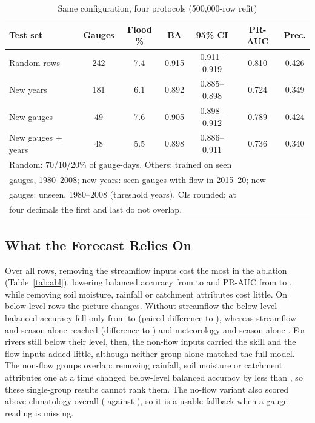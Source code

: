 \documentclass[conference]{IEEEtran}
\begin{document}
\begin{table}[t]
\caption{Same configuration, four protocols (500,000-row refit)}
\label{tab:leak}
\centering
\footnotesize
\setlength{\tabcolsep}{1.6pt}
\begin{tabular}{lcccccc}
\toprule
Test set & Gauges & Flood \% & BA & 95\% CI & PR-AUC & Prec.\\
\midrule
Random rows & 242 & 7.4 & 0.915 & 0.911--0.919 & 0.810 & 0.426\\
New years & 181 & 6.1 & 0.892 & 0.885--0.898 & 0.724 & 0.349\\
New gauges & 49 & 7.6 & 0.905 & 0.898--0.912 & 0.789 & 0.424\\
New gauges + years & 48 & 5.5 & 0.898 & 0.886--0.911 & 0.736 & 0.340\\
\bottomrule
\multicolumn{7}{l}{\scriptsize Random: 70/10/20\% of gauge-days. Others: trained on seen}\\
\multicolumn{7}{l}{\scriptsize gauges, 1980--2008; new years: seen gauges with flow in 2015--20; new}\\
\multicolumn{7}{l}{\scriptsize gauges: unseen, 1980--2008 (threshold years). CIs rounded; at}\\
\multicolumn{7}{l}{\scriptsize four decimals the first and last do not overlap.}\\
\end{tabular}
\end{table}

\subsection{What the Forecast Relies On}
Over all rows, removing the streamflow inputs cost the most in the ablation (Table~\ref{tab:abl}), lowering balanced accuracy from \AblAllBA{} to \NoFlowBA{} and PR-AUC from \AblAllPR{} to \NoFlowPR, while removing soil moisture, rainfall or catchment attributes cost little. On below-level rows the picture changes. Without streamflow the below-level balanced accuracy fell only from \OnsetAll{} to \OnsetNoFlow{} (paired difference \BelNoFlowLo{} to \BelNoFlowHi), whereas streamflow and season alone reached \OnsetFlowOnly{} (difference \BelNoMetLo{} to \BelNoMetHi) and meteorology and season alone \MetOnBA. For rivers still below their level, then, the non-flow inputs carried the skill and the flow inputs added little, although neither group alone matched the full model. The non-flow groups overlap: removing rainfall, soil moisture or catchment attributes one at a time changed below-level balanced accuracy by less than \AblOnTol, so these single-group results cannot rank them. The no-flow variant also scored above climatology overall (\NoFlowBA{} against \ClimBA), so it is a usable fallback when a gauge reading is missing.
\end{document}
